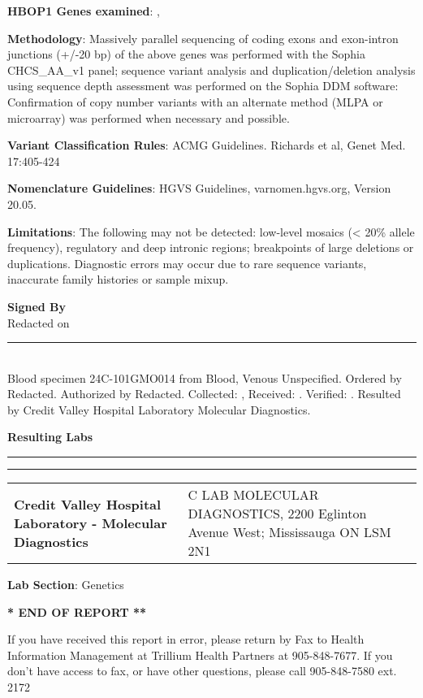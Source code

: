 \documentclass[10pt,letterpaper]{extarticle}
\newcommand{\doublerule}{\rule{\textwidth}{1pt}

\vspace{-2em}%
\rule{\textwidth}{1pt}}
\newcommand{\data}[1]{}
\newenvironment{dataiter}[1]{}{}
\begin{document}
{\bf HBOP1 Genes examined}: \begin{dataiter}{tested_genes}\data{gene_symbol}, \end{dataiter}

{\bf Methodology}: Massively parallel sequencing of coding exons and exon-intron junctions (+/-20 bp) of the above genes was performed with the Sophia CHCS\_AA\_v1 panel; sequence variant analysis and duplication/deletion analysis using sequence depth assessment was performed on the Sophia DDM software: Confirmation of copy number variants with an alternate method (MLPA or microarray) was performed when necessary and possible. 

{\bf Variant Classification Rules}: ACMG Guidelines. Richards et al, Genet Med. 17:405-424 

{\bf Nomenclature Guidelines}: HGVS Guidelines, varnomen.hgvs.org, Version 20.05. 

{\bf Limitations}: The following may not be detected: low-level mosaics (< 20\% allele frequency), regulatory and deep intronic regions; breakpoints of large deletions or duplications. Diagnostic errors may occur due to rare sequence variants, inaccurate family histories or sample mixup.

{\bf \large Signed By}\\
Redacted on \data{date_verified}

\vspace{2em}
\rule{\textwidth}{1pt}\\
{\small Blood specimen 24C-101GMO014 from Blood, Venous Unspecified. Ordered by Redacted. Authorized by Redacted. Collected: \data{date_collected}, Received: \data{date_received}. Verified: \data{date_verified}. Resulted by Credit Valley Hospital Laboratory Molecular Diagnostics.}

\vspace{2em}
{\bf \large Resulting Labs}\\
\doublerule

\begin{tabular}{p{5cm} p{15cm}}
\bf \small Credit Valley Hospital Laboratory - Molecular Diagnostics & \small C LAB MOLECULAR DIAGNOSTICS, 2200 Eglinton Avenue West; Mississauga ON LSM 2N1
\end{tabular}

{\bf Lab Section}: Genetics

\begin{center}
\bf ** END OF REPORT **
\end{center}

\begin{center}
\scriptsize
If you have received this report in error, please return by Fax to Health Information Management at Trillium Health Partners at 905-848-7677. If you don't have access to fax, or have other questions, please call 905-848-7580 ext. 2172
\end{center}
\end{document}
